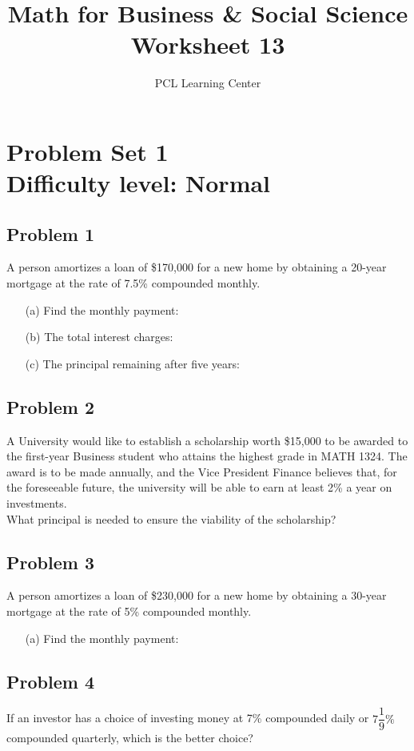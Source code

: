 \documentclass[12pt]{article}
\title{Math for Business \& Social Science\\ Worksheet 13}
\author{PCL Learning Center}
\date{}
\begin{document}
\maketitle

\section*{Problem Set 1\\Difficulty level: Normal}
\subsection*{Problem 1}
A person amortizes a loan of \$170,000 for a new home by obtaining a 20-year mortgage at the rate of 7.5\% compounded monthly.

\begin{enumerate}
    \item[(a)] Find the monthly payment:
    \item[(b)] The total interest charges:
    \item[(c)] The principal remaining after five years:
\end{enumerate}

\subsection*{Problem 2}
A University would like to establish a scholarship worth \$15,000 to be awarded to the first-year Business student who attains the highest grade in MATH 1324. The award is to be made annually, and the Vice President Finance believes that, for the foreseeable future, the university will be able to earn at least 2\% a year on investments.\\
What principal is needed to ensure the viability of the scholarship?

\subsection*{Problem 3}
A person amortizes a loan of \$230,000 for a new home by obtaining a 30-year mortgage at the rate of 5\% compounded monthly.

\begin{enumerate}
    \item[(a)] Find the monthly payment:
\end{enumerate}

\subsection*{Problem 4}
If an investor has a choice of investing money at 7\% compounded daily or \(7\dfrac{1}{9}\%\) compounded quarterly, which is the better choice?\\
\end{document}
